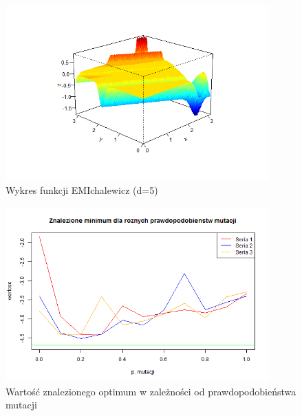 \documentclass[11pt, a4paper]{article}
\begin{document}
\begin{figure}[H]
	\begin{center}
		\includegraphics[width=0.9\textwidth]{./assets/EMichalewicz1.png} %
		\caption{Wykres funkcji EMIchalewicz (d=5)}
		\label{fig:emichalewicz1}
	\end{center}
\end{figure}

\begin{figure}[H]
	\begin{center}
		\includegraphics[width=0.9\textwidth]{./assets/EMichalewicz2.png} %
		\caption{Wartość znalezionego optimum w zależności od prawdopodobieństwa mutacji}
		\label{fig:emichalewicz2}
	\end{center}
\end{figure}
\end{document}
